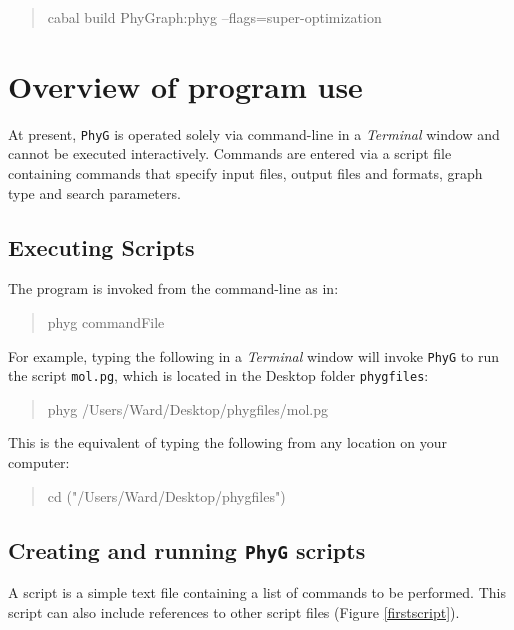 \documentclass[11pt]{book}
\newcommand{\phyg}{\texttt{PhyG} }
\begin{document}
{{		\begin{quote}
		cabal build PhyGraph:phyg --flags=super-optimization
		\end{quote}
		
\section{Overview of program use}
	At present, \phyg is operated solely via command-line in a \textit{Terminal} window
	and cannot be executed interactively. Commands are entered via a script file 
	containing commands that specify input files, output files and formats, graph type 
	and search parameters.
		
	\subsection{Executing Scripts}
		The program is invoked from the command-line as in:
		
		\begin{quote}
		phyg commandFile
		\end{quote}
		
		\smallskip
		
		\noindent For example, typing the following in a \textit{Terminal} window will invoke 
		\phyg to run the script \texttt{mol.pg}, which is located in the Desktop folder 
		\texttt{phygfiles}:
		
		\begin{quote}
  		phyg /Users/Ward/Desktop/phygfiles/mol.pg
		\end{quote}
		
		\bigskip
		
		\noindent 
		This is the equivalent of typing the following from any location on your computer:
		
		\begin{quote}
   		cd ("/Users/Ward/Desktop/phygfiles")
		\end{quote}
			
		\subsection{Creating and running \phyg scripts}
		A script is a simple text file containing a list of commands to be performed. 
		This script can also include references to other script files 
		(Figure \ref{firstscript}).
		
}}
\end{document}
